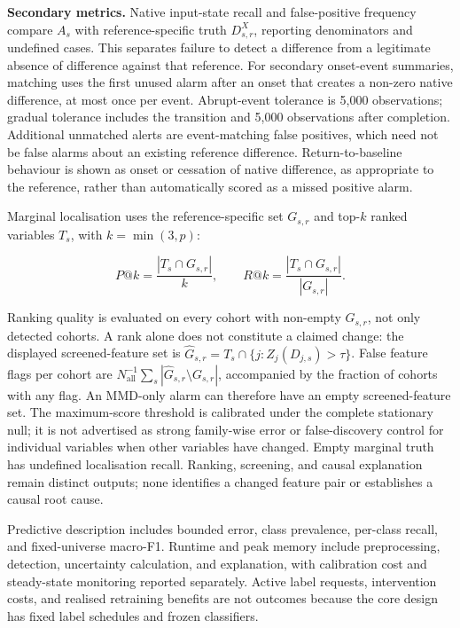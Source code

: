\documentclass[
]{article}
\begin{document}
\textbf{Secondary metrics.} Native input-state recall and false-positive
frequency compare \(A_s\) with reference-specific truth \(D_{s,r}^X\),
reporting denominators and undefined cases. This separates failure to
detect a difference from a legitimate absence of difference against that
reference. For secondary onset-event summaries, matching uses the first
unused alarm after an onset that creates a non-zero native difference,
at most once per event. Abrupt-event tolerance is 5,000 observations;
gradual tolerance includes the transition and 5,000 observations after
completion. Additional unmatched alerts are event-matching false
positives, which need not be false alarms about an existing reference
difference. Return-to-baseline behaviour is shown as onset or cessation
of native difference, as appropriate to the reference, rather than
automatically scored as a missed positive alarm.

Marginal localisation uses the reference-specific set \(G_{s,r}\) and
top-\(k\) ranked variables \(T_s\), with \(k=\min(3,p)\):

\[
P@k=\frac{|T_s\cap G_{s,r}|}{k},
\qquad
R@k=\frac{|T_s\cap G_{s,r}|}{|G_{s,r}|}.
\]

Ranking quality is evaluated on every cohort with non-empty \(G_{s,r}\),
not only detected cohorts. A rank alone does not constitute a claimed
change: the displayed screened-feature set is
\(\widehat G_{s,r}=T_s\cap\{j:Z_j(D_{j,s})>\tau\}\). False feature flags
per cohort are
\(N_{\mathrm{all}}^{-1}\sum_s|\widehat G_{s,r}\setminus G_{s,r}|\),
accompanied by the fraction of cohorts with any flag. An MMD-only alarm
can therefore have an empty screened-feature set. The maximum-score
threshold is calibrated under the complete stationary null; it is not
advertised as strong family-wise error or false-discovery control for
individual variables when other variables have changed. Empty marginal
truth has undefined localisation recall. Ranking, screening, and causal
explanation remain distinct outputs; none identifies a changed feature
pair or establishes a causal root cause.

Predictive description includes bounded error, class prevalence,
per-class recall, and fixed-universe macro-F1. Runtime and peak memory
include preprocessing, detection, uncertainty calculation, and
explanation, with calibration cost and steady-state monitoring reported
separately. Active label requests, intervention costs, and realised
retraining benefits are not outcomes because the core design has fixed
label schedules and frozen classifiers.
\end{document}
